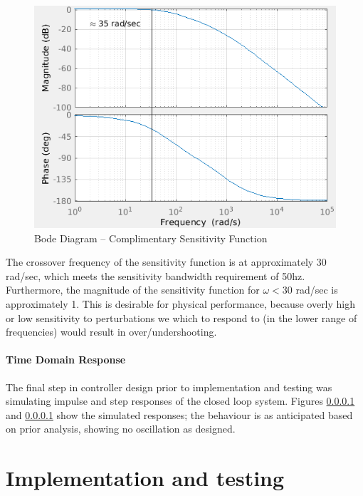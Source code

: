 \documentclass[11pt, a4paper,twocolumn]{article}
\begin{document}
			\begin{figure}[ht!]
			\centering
			\includegraphics[scale=0.4]{bode_T}
			\caption{Bode Diagram -- Complimentary Sensitivity Function}
			\label{fig:bode_T}
			\end{figure}
			
			The crossover frequency of the sensitivity function is at approximately 30 rad/sec, which meets the sensitivity bandwidth requirement of 50hz. Furthermore, the magnitude of the sensitivity function for $ \omega < 30 $ rad/sec is approximately 1. This is desirable for physical performance, because overly high or low sensitivity to perturbations we which to respond to (in the lower range of frequencies) would result in over/undershooting.
			
			
	\paragraph{		Time Domain Response		}
			The final step in controller design prior to implementation and testing was simulating impulse and step responses of the closed loop system. Figures \ref{} and \ref{} show the simulated responses; the behaviour is as anticipated based on prior analysis, showing no oscillation as designed.
	
    \section{Implementation and testing}\label{sec:test}
\end{document}
